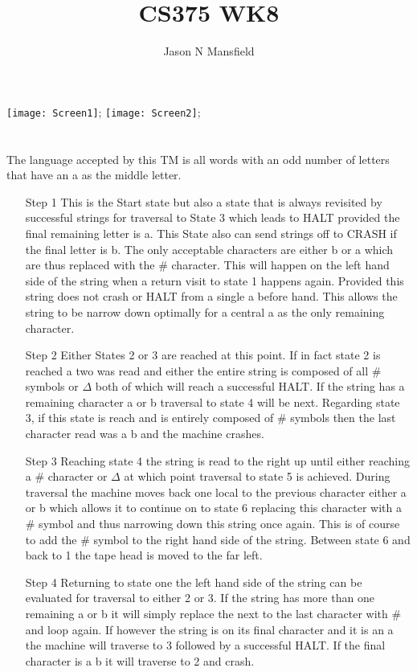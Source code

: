 \documentclass[12pt]{article}
\begin{document}
\title{CS375 WK8}
\author{Jason N Mansfield}
\maketitle


\begin{center}
\texttt{[image: Screen1]};
\clearpage
\texttt{[image: Screen2]};
\end{center}
\setcounter{section}{1}
\section{}
The language accepted by this TM is all words with an odd number of letters that have an a as
the middle letter.

\begin{enumerate}
\item[Step 1] This is the Start state but also a state that is always revisited by successful strings for traversal to State 3 which leads to HALT provided the final remaining letter is a. This State also can send strings off to CRASH if the final letter is b. The only acceptable characters are either b or a which are thus replaced with the \# character. This will happen on the left hand side of the string when a return visit to state 1 happens again. Provided this string does not crash or HALT from a single a before hand. This allows the string to be narrow down optimally for a central a as the only remaining character.
\item [Step 2] Either States 2 or 3 are reached at this point. If in fact state 2 is reached a two was read and either the entire string is composed of all \# symbols or $\Delta$ both of which will reach a successful HALT. If the string has a remaining character a or b traversal to state 4 will be next. Regarding state 3, if this state is reach and is entirely composed of \# symbols then the last character read was a b and the machine crashes. 
\item[Step 3] Reaching state 4 the string is read to the right up until either reaching a \# character or $\Delta$ at which point traversal to state 5 is achieved. During traversal the machine moves back one local to the previous character either a or b which allows it to continue on to state 6  replacing this character with a \# symbol and thus narrowing down this string once again. This is of course to add the \# symbol to the right hand side of the string. Between state 6 and back to 1 the tape head is moved to the far left.
\item[Step 4] 
Returning to state one the left hand side of the string can be evaluated for traversal to either 2 or 3. If the string has more than one remaining a or b it will simply replace the next to the last character with \# and loop again. If however the string is on its final character and it is an a the machine will traverse to 3 followed by a successful HALT. If the final character is a b it will traverse to 2 and crash.
\end{enumerate}
\end{document}
